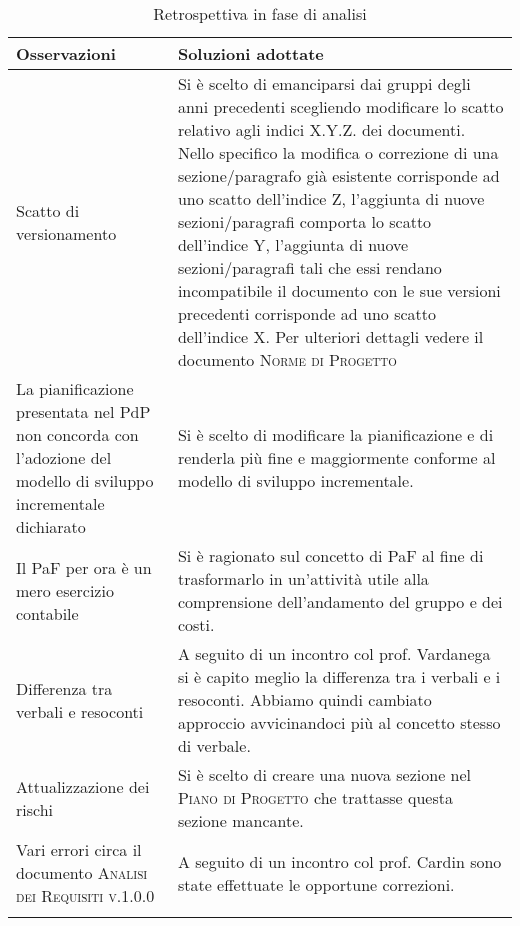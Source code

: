 \begin{center}
	\begin{longtable}{|p{5cm}|p{10cm}|}
		\hline
		\rowcolor{lightgray}
		\textbf{Osservazioni} & \textbf{Soluzioni adottate} \\
		\hline

		Scatto di versionamento & Si è scelto di emanciparsi dai gruppi degli anni precedenti scegliendo modificare	lo scatto relativo agli indici X.Y.Z. dei documenti. Nello specifico la modifica o correzione di una sezione/paragrafo già esistente corrisponde ad uno scatto dell'indice Z, l'aggiunta di nuove sezioni/paragrafi comporta lo scatto dell'indice Y, l'aggiunta di nuove sezioni/paragrafi tali che essi rendano incompatibile il documento con le sue versioni precedenti corrisponde ad uno scatto dell'indice X. Per ulteriori dettagli vedere il documento \textsc{Norme di Progetto} \\
		La pianificazione presentata nel PdP non concorda con l’adozione del modello di sviluppo incrementale dichiarato & Si è scelto di modificare la pianificazione e di renderla più fine e maggiormente conforme al modello di sviluppo incrementale. \\
		Il PaF per ora è un mero esercizio contabile & Si è ragionato sul concetto di PaF al fine di trasformarlo in un'attività utile alla comprensione dell'andamento del gruppo e dei costi. \\
		Differenza tra verbali e resoconti & A seguito di un incontro col prof. Vardanega si è capito meglio la differenza tra i verbali e i resoconti. Abbiamo quindi cambiato approccio avvicinandoci più al concetto stesso di verbale. \\
		Attualizzazione dei rischi & Si è scelto di creare una nuova sezione nel \textsc{Piano di Progetto} che trattasse questa sezione mancante. \\
		Vari errori circa il documento \textsc{Analisi dei Requisiti v.1.0.0} & A seguito di un incontro col prof. Cardin sono state effettuate le opportune correzioni. \\

		\hline
		\rowcolor{white}
		\caption{Retrospettiva in fase di analisi}
	\end{longtable}
\end{center}

